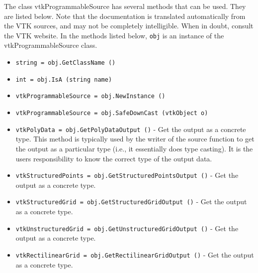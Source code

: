 The class vtkProgrammableSource has several methods that can be used.
  They are listed below.
Note that the documentation is translated automatically from the VTK sources,
and may not be completely intelligible.  When in doubt, consult the VTK website.
In the methods listed below, \verb|obj| is an instance of the vtkProgrammableSource class.
\begin{itemize}
\item  \verb|string = obj.GetClassName ()|

\item  \verb|int = obj.IsA (string name)|

\item  \verb|vtkProgrammableSource = obj.NewInstance ()|

\item  \verb|vtkProgrammableSource = obj.SafeDownCast (vtkObject o)|

\item  \verb|vtkPolyData = obj.GetPolyDataOutput ()| -  Get the output as a concrete type. This method is typically used by the
 writer of the source function to get the output as a particular type
 (i.e., it essentially does type casting). It is the users responsibility
 to know the correct type of the output data.

\item  \verb|vtkStructuredPoints = obj.GetStructuredPointsOutput ()| -  Get the output as a concrete type.

\item  \verb|vtkStructuredGrid = obj.GetStructuredGridOutput ()| -  Get the output as a concrete type.

\item  \verb|vtkUnstructuredGrid = obj.GetUnstructuredGridOutput ()| -  Get the output as a concrete type.

\item  \verb|vtkRectilinearGrid = obj.GetRectilinearGridOutput ()| -  Get the output as a concrete type.

\end{itemize}
